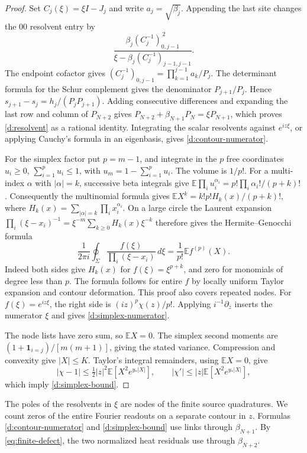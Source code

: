 \begin{proof}
Set \(C_j(\xi)=\xi I-J_j\) and write \(a_j=\sqrt{\beta_j}\).
Appending the last site changes the \(00\) resolvent entry by
\[
 \frac{\beta_j(C_j^{-1})_{0,j-1}^{\,2}}
      {\xi-\beta_j(C_j^{-1})_{j-1,j-1}}.
\]
The endpoint cofactor gives
\((C_j^{-1})_{0,j-1}=\prod_{k=1}^{j-1}a_k/P_j\).
The determinant formula for the Schur complement gives the denominator
\(P_{j+1}/P_j\). Hence \(s_{j+1}-s_j=h_j/(P_jP_{j+1})\).
Adding consecutive differences and expanding the last row and column of
\(P_{N+2}\) gives \(P_{N+2}+\beta_{N+1}P_N=\xi P_{N+1}\), which
proves \eqref{d:resolvent} as a rational identity. Integrating the
scalar resolvents against \(e^{iz\xi}\), or applying Cauchy's formula
in an eigenbasis, gives \eqref{d:contour-numerator}.

For the simplex factor put \(p=m-1\), and integrate in the \(p\) free
coordinates \(u_i\ge0\), \(\sum_{i=1}^{p}u_i\le1\), with
\(u_m=1-\sum_{i=1}^p u_i\). The volume is \(1/p!\). For a multi-index
\(\alpha\) with \(|\alpha|=k\), successive beta integrals give
\(\mathbb E\prod_i u_i^{\alpha_i}=p!\prod_i\alpha_i!/(p+k)!\).
Consequently the multinomial formula gives
\(\mathbb E X^k=k!p!H_k(x)/(p+k)!\), where
\(H_k(x)=\sum_{|\alpha|=k}\prod_i x_i^{\alpha_i}\).
On a large circle the Laurent expansion
\(\prod_i(\xi-x_i)^{-1}=\xi^{-m}\sum_{k\ge0}H_k(x)\xi^{-k}\)
therefore gives the Hermite--Genocchi formula
\[
 \frac1{2\pi i}\oint_\Sigma
      \frac{f(\xi)}{\prod_i(\xi-x_i)}\,d\xi
 =\frac{1}{p!}\mathbb E f^{(p)}(X).
\]
Indeed both sides give \(H_k(x)\) for \(f(\xi)=\xi^{p+k}\), and zero
for monomials of degree less than \(p\). The formula follows for entire
\(f\) by locally uniform Taylor expansion and contour deformation.
This proof also covers repeated nodes. For \(f(\xi)=e^{iz\xi}\), the
right side is \((iz)^p\chi(z)/p!\). Applying \(i^{-1}\partial_z\)
inserts the numerator \(\xi\) and gives \eqref{d:simplex-numerator}.

The node lists have zero sum, so \(\mathbb E X=0\). The simplex
second moments are \((1+\mathbf 1_{i=j})/[m(m+1)]\), giving the stated
variance. Compression and convexity give \(|X|\le K\). Taylor's
integral remainders, using \(\mathbb E X=0\), give
\[
 |\chi-1|\le \tfrac12 |z|^2\mathbb E[X^2e^{y_*|X|}],
 \qquad
 |\chi'|\le |z|\mathbb E[X^2e^{y_*|X|}],
\]
which imply \eqref{d:simplex-bound}.
\end{proof}

The poles of the resolvents in \(\xi\) are nodes of the finite source
quadratures. We count zeros of the entire Fourier readouts on a
separate contour in \(z\). Formulas \eqref{d:contour-numerator}
and \eqref{d:simplex-bound} use links through \(\beta_{N+1}\).
By \eqref{eq:finite-defect}, the two normalized heat residuals use
through \(\beta_{N+2}\).

